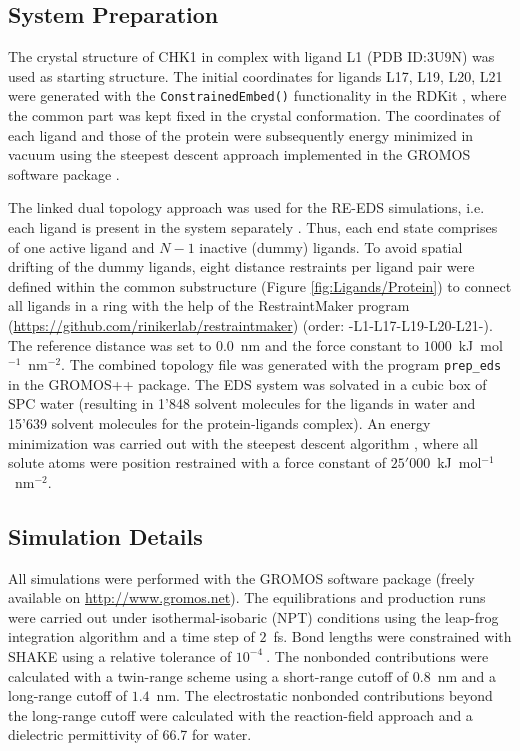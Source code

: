\subsection{System Preparation}%
The crystal structure of CHK1 in complex with ligand L1 (PDB ID:3U9N) was used as starting structure. The initial coordinates for ligands L17, L19, L20, L21 were generated with the {\tt{ConstrainedEmbed()}} functionality in the RDKit \cite{Landrum2021}, where the common part was kept fixed in the crystal conformation. The coordinates of each ligand and those of the protein were subsequently energy minimized in vacuum using the steepest descent \cite{Ruder2016} approach implemented in the GROMOS software package \cite{Schmid2012}. 

The linked dual topology approach was used for the RE-EDS simulations, i.e. each ligand is present in the system separately \cite{Riniker2011}. Thus, each end state comprises of one active ligand and $N-1$ inactive (dummy) ligands. To avoid spatial drifting of the dummy ligands, eight distance restraints per ligand pair were defined within the common substructure (Figure \ref{fig:Ligands/Protein}) to connect all ligands in a ring with the help of the RestraintMaker program (\url{https://github.com/rinikerlab/restraintmaker}) (order: -L1-L17-L19-L20-L21-). The reference distance was set to 0.0~nm and the force constant to $1000$~kJ~mol$^{-1}$~nm$^{-2}$.
The combined topology file was generated with the program {\tt{prep\_eds}} in the GROMOS++ \cite{Eichenberger2011} package. 
The EDS system was solvated in a cubic box of SPC \cite{Berendsen1981} water (resulting in 1'848 solvent molecules for the ligands in water and 15'639 solvent molecules for the protein-ligands complex). 
An energy minimization was carried out with the steepest descent algorithm \cite{Ruder2016}, where all solute atoms were position restrained with a force constant of $25'000$~kJ~mol$^{-1}$~nm$^{-2}$. 

\subsection{Simulation Details}
All simulations were performed with the GROMOS software package \cite{Schmid2012} (freely available on \url{http://www.gromos.net}).
The equilibrations and production runs were carried out under isothermal-isobaric (NPT) conditions using the leap-frog integration algorithm \cite{Hockney1970} and a time step of $2$~fs. 
Bond lengths were constrained with SHAKE \cite{Ryckaert1977} using a relative tolerance of $10^{-4}~$. 
The nonbonded contributions were calculated with a twin-range scheme using a short-range cutoff of $0.8$~nm and a long-range cutoff of $1.4$~nm. 
The electrostatic nonbonded contributions beyond the long-range cutoff were calculated with the reaction-field \cite{Tironi1995} approach and a dielectric permittivity of 66.7 \cite{Glattli2002} for water. 

